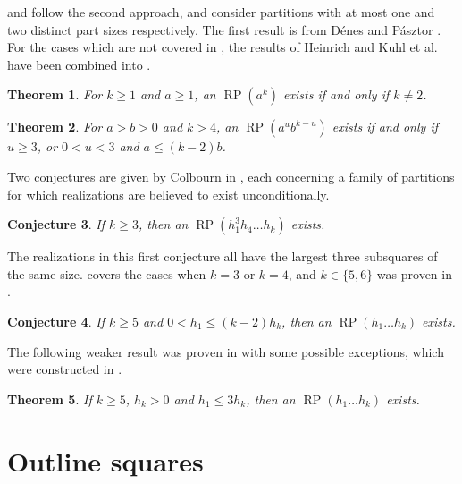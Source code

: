 \documentclass[preprint,nonatbib]{elsarticle}
\DeclareMathOperator{\LS}{RP}
\newtheorem{theorem}{Theorem}[section]
\newtheorem{conjecture}[theorem]{Conjecture}
\theoremstyle{definition}
\numberwithin{equation}{section}
\begin{document}
 and  follow the second approach, and consider partitions with at most one and two distinct part sizes respectively. The first result is from D{\'e}nes and P{\'a}sztor \cite{denes1963some}. For the cases which are not covered in , the results of Heinrich \cite{heinrich1982disjoint} and Kuhl et al.~\cite{kuhl2018latin} have been combined into .

\begin{theorem}
\label{thm: a^n square}
    For $k\geq 1$ and $a\geq 1$, an $\LS(a^k)$ exists if and only if $k\neq 2$.
\end{theorem}

\begin{theorem}
\label{thm: squaresatmost2}
    For $a>b>0$ and $k>4$, an $\LS(a^ub^{k-u})$ exists if and only if $u\geq 3$, or $0< u < 3$ and $a\leq (k-2)b$.
\end{theorem}

Two conjectures are given by Colbourn in \cite{colbourn2018latin}, each concerning a family of partitions for which realizations are believed to exist unconditionally.

\begin{conjecture}
\label{conj: largest 3}
    If $k\geq 3$, then an $\LS(h_1^3h_4\dots h_k)$ exists.
\end{conjecture}

The realizations in this first conjecture all have the largest three subsquares of the same size.  covers the cases when $k=3$ or $k=4$, and $k\in\{5,6\}$ was proven in \cite{colbourn2018latin}.

\begin{conjecture}
\label{conj: k-2}
    If $k\geq 5$ and $0<h_1\leq (k-2)h_k$, then an $\LS(h_1\dots h_k)$ exists.
\end{conjecture}

The following weaker result was proven in \cite{colbourn2018latin} with some possible exceptions, which were constructed in \cite{kemp2024latin}.

\begin{theorem}
    If $k\geq 5$, $h_k>0$ and $h_1\leq 3h_k$, then an $\LS(h_1\dots h_k)$ exists.
\end{theorem}




\section{Outline squares}
\end{document}
